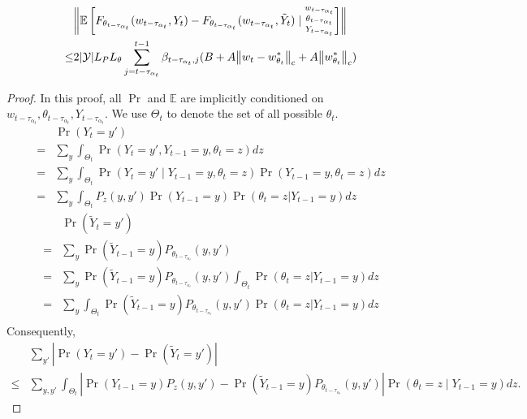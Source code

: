 \documentclass[twoside,11pt]{article}
\newcommand{\fY}{\mathcal{Y}}
\newcommand{\E}{\mathbb{E}}
\newcommand{\ny}{{|\fY|}}
\numberwithin{assucounter}{section}
\begin{document}
\begin{lemma}
  \label{lem chain difference bound}
  \begin{align}
      &\norm{ \E \left[{F_{\theta_{t - \tau_{\alpha_t}}}(w_{t - \tau_{\alpha_t}}, Y_t) -F_{\theta_{t - \tau_{\alpha_t}}}(w_{t - \tau_{\alpha_t}}, \tilde Y_t)} \mid \substack{w_{t-\tau_{\alpha_t}} \\ \theta_{t-\tau_{\alpha_t}} \\ Y_{t-\tau_{\alpha_t}}} \right]} \\
      \leq &2\ny L_PL_\theta \sum_{j=t-\tau_{\alpha_t}}^{t-1}\beta_{t-\tau_{\alpha_t}, j}(B + A \norm{w_t - w^*_{\theta_t}}_c + A \norm{w^*_{\theta_t}}_c)
  \end{align}
\end{lemma}
\begin{proof}
  In this proof, all $\Pr$ and $\E$ are implicitly conditioned on $w_{t-\tau_{\alpha_t}}, \theta_{t-\tau_{\alpha_t}}, Y_{t-\tau_{\alpha_t}}$. 
  We use $\Theta_t$ to denote the set of all possible $\theta_t$.
  \begin{align}
      &\Pr(Y_t = y') \\
      =& \sum_{y} \int_{\Theta_{t}} \Pr(Y_t = y' , Y_{t-1} = y, \theta_{t} = z) dz \\
      =& \sum_{y} \int_{\Theta_{t}} \Pr(Y_t = y' \mid Y_{t-1} = y, \theta_{t} = z) \Pr(Y_{t-1} = y, \theta_{t} = z) dz \\
      =& \sum_{y} \int_{\Theta_{t}} P_{z}(y, y') \Pr(Y_{t-1} = y) \Pr(\theta_{t} = z | Y_{t-1} = y) dz
  \end{align}
  \begin{align}
      &\Pr(\tilde Y_t = y') \\
      =& \sum_{y} \Pr(\tilde Y_{t-1} = y) P_{\theta_{t-\tau_{\alpha_t}}}(y, y') \\
      =& \sum_{y} \Pr(\tilde Y_{t-1} = y) P_{\theta_{t-\tau_{\alpha_t}}}(y, y') \int_{\Theta_{t}} \Pr(\theta_{t} = z | Y_{t-1} = y) dz \\
      =& \sum_{y} \int_{\Theta_{t}} \Pr(\tilde Y_{t-1} = y) P_{\theta_{t-\tau_{\alpha_t}}}(y, y')  \Pr(\theta_{t} = z | Y_{t-1} = y) dz \\
  \end{align}
  Consequently,
  \begin{align}
      &\sum_{y'} \left|\Pr(Y_t = y') - \Pr(\tilde Y_t = y') \right| \\
      \leq &\sum_{y, y'} \int_{\Theta_{t}} \left| \Pr(Y_{t-1} = y) P_z(y, y') - \Pr(\tilde Y_{t-1} = y) P_{\theta_{t-\tau_{\alpha_t}}}(y, y')\right| \Pr(\theta_{t} = z \mid Y_{t-1} = y) dz.

\end{align}
\end{proof}
\end{document}
